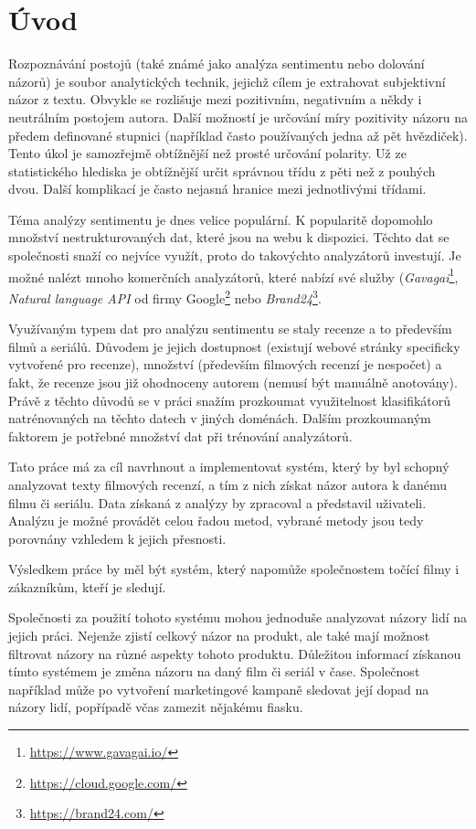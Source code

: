 \chapter{Úvod}
\label{uvod}

Rozpoznávání postojů (také známé jako analýza sentimentu nebo dolování názorů) je soubor analytických technik, jejichž cílem je extrahovat subjektivní názor z textu. Obvykle se rozlišuje mezi pozitivním, negativním a někdy i neutrálním postojem autora.
Další možností je určování míry pozitivity názoru na předem definované stupnici (například často používaných jedna až pět hvězdiček). Tento úkol je samozřejmě obtížnější než prosté určování polarity. Už ze statistického hlediska je obtížnější určit správnou třídu z pěti než z pouhých dvou. Další komplikací je často nejasná hranice mezi jednotlivými třídami. 

Téma analýzy sentimentu je dnes velice populární. K popularitě dopomohlo množství nestrukturovaných dat, které jsou na webu k dispozici. Těchto dat se společnosti snaží co nejvíce využít, proto do takovýchto analyzátorů investují. Je možné nalézt mnoho komerčních analyzátorů, které nabízí své služby (\emph{Gavagai}\footnote{\url{https://www.gavagai.io/}}, \emph{Natural language API} od firmy Google\footnote{\url{https://cloud.google.com/}} nebo \emph{Brand24}\footnote{\url{https://brand24.com/}}.

Využívaným typem dat pro analýzu sentimentu se staly recenze a to především filmů a seriálů. Důvodem je jejich dostupnost (existují webové stránky specificky vytvořené pro recenze), množství (především filmových recenzí je nespočet) a fakt, že recenze jsou již ohodnoceny autorem (nemusí být manuálně anotovány). Právě z těchto důvodů se v práci snažím prozkoumat využitelnost klasifikátorů natrénovaných na těchto datech v jiných doménách. Dalším prozkoumaným faktorem je potřebné množství dat při trénování analyzátorů.

Tato práce má za cíl navrhnout a implementovat systém, který by byl schopný analyzovat texty filmových recenzí, a tím z nich získat názor autora k danému filmu či seriálu. Data získaná z analýzy by zpracoval a představil uživateli. Analýzu je možné provádět celou řadou metod, vybrané metody jsou tedy porovnány vzhledem k jejich přesnosti. 

Výsledkem práce by měl být systém, který napomůže společnostem točící filmy i zákazníkům, kteří je sledují.

Společnosti za použití tohoto systému mohou jednoduše analyzovat názory lidí na jejich práci. Nejenže zjistí celkový názor na produkt, ale také mají možnost filtrovat názory na různé aspekty tohoto produktu. Důležitou informací získanou tímto systémem je změna názoru na daný film či seriál v čase. Společnost například může po vytvoření marketingové kampaně sledovat její dopad na názory lidí, popřípadě včas zamezit nějakému fiasku.

